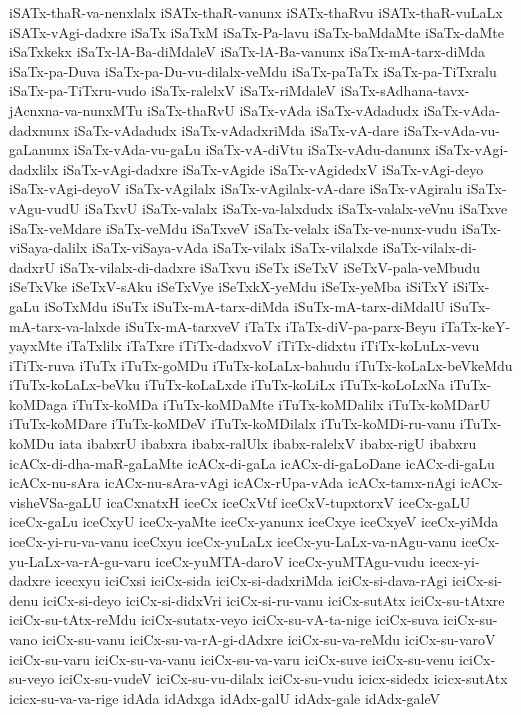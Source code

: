 {iSATx-thaR-va-nenxlalx
iSATx-thaR-vanunx
iSATx-thaRvu
iSATx-thaR-vuLaLx
iSATx-vAgi-dadxre
iSaTx
iSaTxM
iSaTx-Pa-lavu
iSaTx-baMdaMte
iSaTx-daMte
iSaTxkekx
iSaTx-lA-Ba-diMdaleV
iSaTx-lA-Ba-vanunx
iSaTx-mA-tarx-diMda
iSaTx-pa-Duva
iSaTx-pa-Du-vu-dilalx-veMdu
iSaTx-paTaTx
iSaTx-pa-TiTxralu
iSaTx-pa-TiTxru-vudo
iSaTx-ralelxV
iSaTx-riMdaleV
iSaTx-sAdhana-tavx-jAcnxna-va-nunxMTu
iSaTx-thaRvU
iSaTx-vAda
iSaTx-vAdadudx
iSaTx-vAda-dadxnunx
iSaTx-vAdadudx
iSaTx-vAdadxriMda
iSaTx-vA-dare
iSaTx-vAda-vu-gaLanunx
iSaTx-vAda-vu-gaLu
iSaTx-vA-diVtu
iSaTx-vAdu-danunx
iSaTx-vAgi-dadxlilx
iSaTx-vAgi-dadxre
iSaTx-vAgide
iSaTx-vAgidedxV
iSaTx-vAgi-deyo
iSaTx-vAgi-deyoV
iSaTx-vAgilalx
iSaTx-vAgilalx-vA-dare
iSaTx-vAgiralu
iSaTx-vAgu-vudU
iSaTxvU
iSaTx-valalx
iSaTx-va-lalxdudx
iSaTx-valalx-veVnu
iSaTxve
iSaTx-veMdare
iSaTx-veMdu
iSaTxveV
iSaTx-velalx
iSaTx-ve-nunx-vudu
iSaTx-viSaya-dalilx
iSaTx-viSaya-vAda
iSaTx-vilalx
iSaTx-vilalxde
iSaTx-vilalx-di-dadxrU
iSaTx-vilalx-di-dadxre
iSaTxvu
iSeTx
iSeTxV
iSeTxV-pala-veMbudu
iSeTxVke
iSeTxV-sAku
iSeTxVye
iSeTxkX-yeMdu
iSeTx-yeMba
iSiTxY
iSiTx-gaLu
iSoTxMdu
iSuTx
iSuTx-mA-tarx-diMda
iSuTx-mA-tarx-diMdalU
iSuTx-mA-tarx-va-lalxde
iSuTx-mA-tarxveV
iTaTx
iTaTx-diV-pa-parx-Beyu
iTaTx-keY-yayxMte
iTaTxlilx
iTaTxre
iTiTx-dadxvoV
iTiTx-didxtu
iTiTx-koLuLx-vevu
iTiTx-ruva
iTuTx
iTuTx-goMDu
iTuTx-koLaLx-bahudu
iTuTx-koLaLx-beVkeMdu
iTuTx-koLaLx-beVku
iTuTx-koLaLxde
iTuTx-koLiLx
iTuTx-koLoLxNa
iTuTx-koMDaga
iTuTx-koMDa
iTuTx-koMDaMte
iTuTx-koMDalilx
iTuTx-koMDarU
iTuTx-koMDare
iTuTx-koMDeV
iTuTx-koMDilalx
iTuTx-koMDi-ru-vanu
iTuTx-koMDu
iata
ibabxrU
ibabxra
ibabx-ralUlx
ibabx-ralelxV
ibabx-rigU
ibabxru
icACx-di-dha-maR-gaLaMte
icACx-di-gaLa
icACx-di-gaLoDane
icACx-di-gaLu
icACx-nu-sAra
icACx-nu-sAra-vAgi
icACx-rUpa-vAda
icACx-tamx-nAgi
icACx-visheVSa-gaLU
icaCxnatxH
iceCx
iceCxVtf
iceCxV-tupxtorxV
iceCx-gaLU
iceCx-gaLu
iceCxyU
iceCx-yaMte
iceCx-yanunx
iceCxye
iceCxyeV
iceCx-yiMda
iceCx-yi-ru-va-vanu
iceCxyu
iceCx-yuLaLx
iceCx-yu-LaLx-va-nAgu-vanu
iceCx-yu-LaLx-va-rA-gu-varu
iceCx-yuMTA-daroV
iceCx-yuMTAgu-vudu
icecx-yi-dadxre
icecxyu
iciCxsi
iciCx-sida
iciCx-si-dadxriMda
iciCx-si-dava-rAgi
iciCx-si-denu
iciCx-si-deyo
iciCx-si-didxVri
iciCx-si-ru-vanu
iciCx-sutAtx
iciCx-su-tAtxre
iciCx-su-tAtx-reMdu
iciCx-sutatx-veyo
iciCx-su-vA-ta-nige
iciCx-suva
iciCx-su-vano
iciCx-su-vanu
iciCx-su-va-rA-gi-dAdxre
iciCx-su-va-reMdu
iciCx-su-varoV
iciCx-su-varu
iciCx-su-va-vanu
iciCx-su-va-varu
iciCx-suve
iciCx-su-venu
iciCx-su-veyo
iciCx-su-vudeV
iciCx-su-vu-dilalx
iciCx-su-vudu
icicx-sidedx
icicx-sutAtx
icicx-su-va-va-rige
idAda
idAdxga
idAdx-galU
idAdx-gale
idAdx-galeV
}
